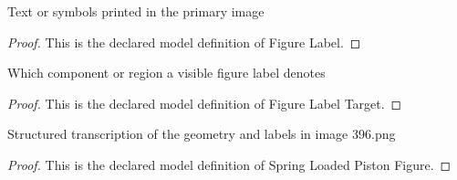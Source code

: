 \begin{definition}
  \label{def:physics:phyx-mini-0396:phyxminiproblems-problemphyxmini0396-figurelabel}
  Text or symbols printed in the primary image
\end{definition}
\begin{proof}
  This is the declared model definition of Figure Label.
\end{proof}
\begin{definition}
  \label{def:physics:phyx-mini-0396:phyxminiproblems-problemphyxmini0396-figurelabeltarget}
  Which component or region a visible figure label denotes
\end{definition}
\begin{proof}
  This is the declared model definition of Figure Label Target.
\end{proof}
\begin{definition}
  \label{def:physics:phyx-mini-0396:phyxminiproblems-problemphyxmini0396-springloadedpistonfigure}
  Structured transcription of the geometry and labels in image 396.png
\end{definition}
\begin{proof}
  This is the declared model definition of Spring Loaded Piston Figure.
\end{proof}
